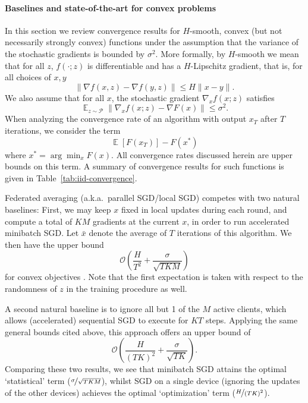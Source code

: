 \documentclass[11pt]{article}
\DeclareMathOperator*{\E}{\mathbb{E}}
\newcommand{\BO}{\mathcal{O}}
\begin{document}
\paragraph{Baselines and state-of-the-art for convex problems}
In this section we review convergence results for $H$-smooth, convex (but not necessarily strongly convex) functions under the assumption that the variance of the stochastic gradients is bounded by $\sigma^2$.
More formally, by $H$-smooth we mean that for all $z$, $f(\cdot; z)$ is differentiable and has a $H$-Lipschitz gradient, that is, for all choices of $x, y$
\[ 
    \|\nabla f(x, z) - \nabla f(y, z)\| \leq H\|x-y\|.
\]
We also assume that for all $x$, the stochastic gradient $\nabla_x f(x; z)$ satisfies
\[
    \E_{z \sim \mathcal{P}}\|\nabla_x f(x; z) - \nabla F(x)\| \leq \sigma^2.
\]
When analyzing the convergence rate of an algorithm with output $x_T$ after $T$ iterations, we consider the term
\begin{equation}\label{eq:convergence_rate_term}
    \E[F(x_T)] - F(x^*)
\end{equation}
where $x^* = \arg\min_x F(x)$. All convergence rates discussed herein are upper bounds on this term.
A summary of convergence results for such functions is given in Table~\ref{tab:iid-convergence}. 

Federated averaging (a.k.a.\ parallel SGD/local SGD) competes with two natural baselines: First, we may keep $x$ fixed in local updates during each round, and compute a total of $K M$ gradients at the current $x$, in order to run accelerated minibatch SGD. Let $\bar{x}$ denote the average of $T$ iterations of this algorithm. We then have the upper bound
\[
 \BO \left(\frac{H}{T^2} + \frac{\sigma}{\sqrt{T K M}}\right)
\]
for convex objectives \cite{Lan2012,cotter2011acmb,dekel12optimal}. Note that the first expectation is taken with respect to the randomness of $z$ in the training procedure as well.

A second natural baseline is to ignore all but 1 of the $M$ active clients, which allows (accelerated) sequential SGD to execute for $K T$ steps. Applying the same general bounds cited above, this approach offers an upper bound of
\[
 \BO\left( \frac{H}{(TK)^2} + \frac{\sigma}{\sqrt{TK}}\right).
\]
Comparing these two results, we see that minibatch SGD attains the optimal `statistical' term ($\nicefrac{\sigma}{\sqrt{TKM}}$), whilst SGD on a single device (ignoring the updates of the other devices) achieves the optimal `optimization' term ($\nicefrac{H}{(TK)^2}$). 
\end{document}
